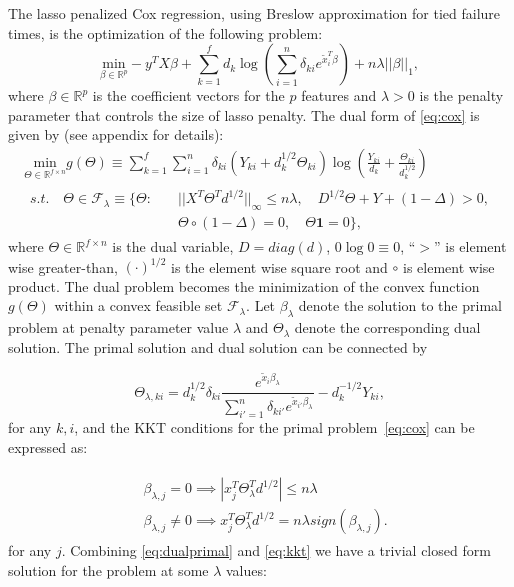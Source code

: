 The lasso penalized Cox regression, using Breslow approximation \citep{breslow1974covariance} for tied failure times, is the optimization of the following problem:
\begin{equation}
    \label{eq:cox}
    \underset{\beta\in \mathbb{R}^p}{\mathrm{min}}-y^TX\beta+\sum_{k=1}^f d_k\log\left(\sum_{i=1}^n \delta_{ki} e^{\tilde{x}_i^T\beta}\right)+n\lambda||\beta||_1,
\end{equation}
where $\beta\in\mathbb{R}^p$ is the coefficient vectors for the $p$ features and $\lambda>0$ is the penalty parameter that controls the size of lasso penalty. The dual form of \eqref{eq:cox} is given by (see appendix for details):
\begin{gather}
        \label{eq:dualTheta}
        \underset{\Theta\in \mathbb{R}^{f\times n}}{\mathrm{min}}g(\Theta)\equiv\sum_{k=1}^f\sum_{i=1}^n\delta_{ki}(Y_{ki}+d_k^{1/2}\Theta_{ki})\log\left(\frac{Y_{ki}}{d_k}+\frac{\Theta_{ki}}{d_k^{1/2}}\right)\\
        \begin{aligned}s.t.\quad \Theta\in \mathcal{F}_\lambda\equiv\{\Theta:\quad
            &||X^T\Theta^Td^{1/2}||_\infty\leq n\lambda,\quad D^{1/2}\Theta+Y+(1-\Delta)> 0,\\& \Theta\circ(1-\Delta)=0,\quad \Theta\mathbf{1}=0\}\nonumber,
        \end{aligned}
\end{gather}
where $\Theta\in \mathbb{R}^{f\times n}$ is the dual variable, $D=diag(d)$, $0\log 0\equiv0$, ``$>$'' is element wise greater-than, $(\cdot)^{1/2}$ is the element wise square root and $\circ$ is element wise product. The dual problem becomes the minimization of the convex function $g(\Theta)$ within a convex feasible set $\mathcal{F}_\lambda$. Let $\beta_\lambda$ denote the solution to the primal problem at penalty parameter value $\lambda$ and $\Theta_{\lambda}$ denote the corresponding dual solution. The primal solution and dual solution can be connected by

\begin{equation}
    \label{eq:dualprimal}
    \Theta_{\lambda,ki}=d_k^{1/2}\delta_{ki}\frac{e^{\tilde{x}_i\beta_\lambda}}{\sum_{i'=1}^n\delta_{ki'}e^{\tilde{x}_{i'}\beta_\lambda}}-d_k^{-1/2}Y_{ki},
\end{equation}
for any $k,i$, and the KKT conditions for the primal problem~\eqref{eq:cox} can be expressed as:

\begin{gather}
    \label{eq:kkt}
    \begin{aligned}&\beta_{\lambda,j}=0\implies\left|x_j^T\Theta_\lambda^Td^{1/2}\right|\leq n\lambda\\
    & \beta_{\lambda,j}\neq0\implies x_j^T\Theta_\lambda^Td^{1/2}= n\lambda\textit{sign}(\beta_{\lambda,j}).
    \end{aligned}
\end{gather}
for any $j$. Combining \eqref{eq:dualprimal} and \eqref{eq:kkt} we have a trivial closed form solution for the problem at some $\lambda$ values:

